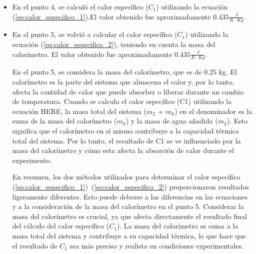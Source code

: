 \documentclass[letterpaper, 12pt]{article}
\begin{document}
\begin{itemize}[label=$\triangleright$]
      \item En el punto 4, se calculó el calor específico ($C_1$)
            utilizando la ecuación (\ref{eq:calor_especifico_1}).\@{}El
            valor obtenido fue aproximadamente $0.435 \frac{J}{K \cdot
                        Kg}$.

      \item En el punto 5, se volvió a calcular el calor específico
            ($C_1$) utilizando la ecuación
            (\ref{eq:calor_especifico_2}), teniendo en cuenta la masa
            del calorímetro. El valor obtenido fue aproximadamente
            $0.435 \frac{J}{K \cdot Kg}$.

            En el punto 5, se considera la masa del calorímetro, que es
            de $0.25$ kg. El calorímetro es la parte del sistema que
            almacena el calor y, por lo tanto, afecta la cantidad de
            calor que puede absorber o liberar durante un cambio de
            temperatura. Cuando se calcula el calor específico (C1)
            utilizando la ecuación HERE, la masa total del sistema
            ($m_2$ + $m_k$) en el denominador es la suma de la masa del
            calorímetro ($m_k$) y la masa de agua añadida ($m_2$). Esto
            significa que el calorímetro en sí mismo contribuye a la
            capacidad térmica total del sistema. Por lo tanto, el
            resultado de C1 se ve influenciado por la masa del
            calorímetro y cómo esta afecta la absorción de calor
            durante el experimento.

            En resumen, los dos métodos utilizados para determinar el
            calor específico
            (\ref{eq:calor_especifico_1})~(\ref{eq:calor_especifico_2})
            proporcionaron resultados ligeramente diferentes. Esto
            puede deberse a las diferencias en las ecuaciones y a la
            consideración de la masa del calorímetro en el punto 5.
            Considerar la masa del calorímetro es crucial, ya que
            afecta directamente el resultado final del cálculo del
            calor específico ($C_1$). La masa del calorímetro se suma a
            la masa total del sistema y contribuye a su capacidad
            térmica, lo que hace que el resultado de $C_1$ sea más
            preciso y realista en condiciones experimentales.
\end{itemize}

\end{document}
